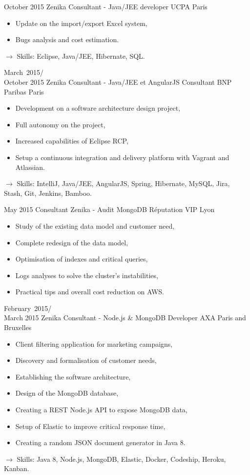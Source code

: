 \documentclass[11pt,a4paper]{moderncv}
\begin{document}
\cventry
{October 2015}
{Zenika Consultant - Java/JEE developer}
{UCPA}
{Paris}
{}
{\begin{itemize}
\item Update on the import/export Excel system,
\item Bugs analysis and cost estimation.
\end{itemize}
$\rightarrow$ Skills: Eclipse, Java/JEE, Hibernate, SQL.
}   %

\cventry
{March\ 2015/\\October 2015}
{Zenika Consultant - Java/JEE et AngularJS Consultant}
{BNP Paribas}
{Paris}
{}
{\begin{itemize}
\item Development on a software architecture design project,
\item Full autonomy on the project,
\item Increased capabilities of Eclipse RCP,
\item Setup a continuous integration and delivery platform with Vagrant and Atlassian.
\end{itemize}
$\rightarrow$ Skills: IntelliJ, Java/JEE, AngularJS, Spring, Hibernate, MySQL, Jira, Stash, Git, Jenkins, Bamboo.
}   %

\cventry
{May 2015}
{Consultant Zenika - Audit MongoDB}
{Réputation VIP}
{Lyon}
{}
{\begin{itemize}
\item Study of the existing data model and customer need,
\item Complete redesign of the data model,
\item Optimisation of indexes and critical queries,
\item Logs analyses to solve the cluster's instabilities,
\item Practical tips and overall cost reduction on AWS.
\end{itemize}
}   %

\cventry
{February\ 2015/\\March 2015}
{Zenika Consultant - Node.js \& MongoDB Developer}
{AXA}
{Paris and Bruxelles}
{}
{\begin{itemize}
\item Client filtering application for marketing campaigns,
\item Discovery and formalisation of customer needs,
\item Establishing the software architecture,
\item Design of the MongoDB database,
\item Creating a REST Node.js API to expose MongoDB data,
\item Setup of Elastic to improve critical response time,
\item Creating a random JSON document generator in Java 8.
\end{itemize}
$\rightarrow$ Skills: Java 8, Node.js, MongoDB, Elastic, Docker, Codeship, Heroku, Kanban.
}   %
\end{document}
